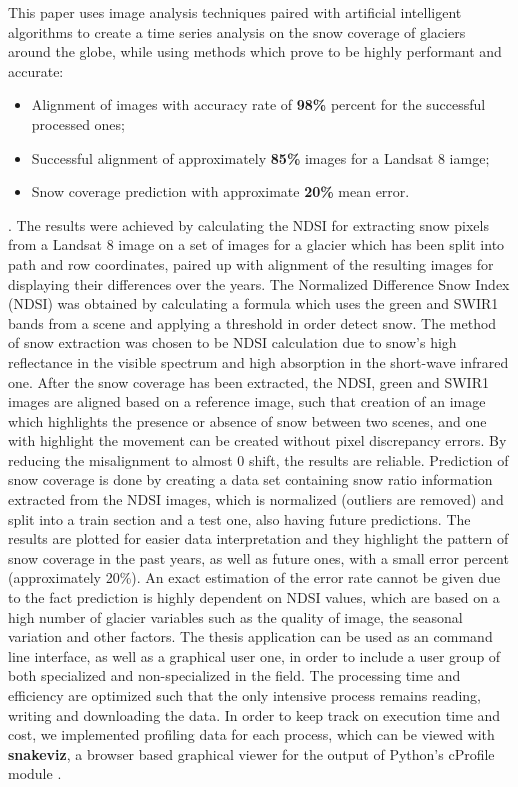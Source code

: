 \documentclass[12pt, a4paper]{report}
\begin{document}
	This paper uses image analysis techniques paired with artificial intelligent algorithms to create a time series analysis on the snow coverage of glaciers around the globe, while using methods which prove to be highly performant and accurate:
	\begin{itemize}
		\item Alignment of images with accuracy rate of \textbf{98\%} percent for the successful processed ones;
		\item Successful alignment of approximately \textbf{85\%} images for a Landsat 8 iamge;
		\item Snow coverage prediction with approximate \textbf{20\%} mean error.
	\end{itemize}.
	The results were achieved by calculating the NDSI for extracting snow pixels from a Landsat 8 image on a set of images for a glacier which has been split into path and row coordinates, paired up with alignment of the resulting images for displaying their differences over the years. The Normalized Difference Snow Index (NDSI) was obtained by calculating a formula which uses the green and SWIR1 bands from a scene and applying a threshold in order detect snow. The method of snow extraction was chosen to be NDSI calculation due to snow's high reflectance in the visible spectrum and high absorption in the short-wave infrared one. 
	\vskip 0.2cm
	After the snow coverage has been extracted, the NDSI, green and SWIR1 images are aligned based on a reference image, such that creation of an image which highlights the presence or absence of snow between two scenes, and one with highlight the movement can be created without pixel discrepancy errors. By reducing the misalignment to almost 0 shift, the results are reliable. 
	Prediction of snow coverage is done by creating a data set containing snow ratio information extracted from the NDSI images, which is normalized (outliers are removed) and split into a train section and a test one, also having future predictions. The results are plotted for easier data interpretation and they highlight the pattern of snow coverage in the past years, as well as future ones, with a small error percent (approximately 20\%). An exact estimation of the error rate cannot be given due to the fact prediction is highly dependent on NDSI values, which are based on a high number of glacier variables such as the quality of image, the seasonal variation and other factors.  
	\vskip  0.2cm
	The thesis application can be used as an command line interface, as well as a graphical user one, in order to include a user group of both specialized and non-specialized in the field. 
	The processing time and efficiency are optimized such that the only intensive process remains reading, writing and downloading the data. In order to keep track on execution time and cost, we implemented profiling data for each process, which can be viewed with \textbf{snakeviz}, a browser based graphical viewer for the output of Python’s cProfile module \cite{snakeviz}.
	
\end{document}
